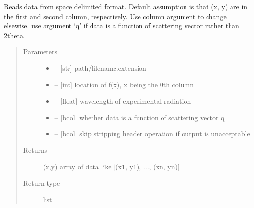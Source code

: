 \documentclass[letterpaper,10pt,english]{sphinxmanual}
\begin{document}
\begin{fulllineitems}
\label{\detokenize{rst/utilities:mstack.utilities.read_data}}
Reads data from space delimited format. Default assumption is that (x, y) are in
the first and second column, respectively. Use column argument to change elsewise.
use argument `q' if data is a function of scattering vector rather than 2theta.
\begin{quote}\begin{description}
\item[{Parameters}] \leavevmode\begin{itemize}
\item {} 
 -- {[}str{]} path/filename.extension

\item {} 
 -- {[}int{]} location of f(x), x being the 0th column

\item {} 
 -- {[}float{]} wavelength of experimental radiation

\item {} 
 -- {[}bool{]} whether data is a function of scattering vector q

\item {} 
 -- {[}bool{]} skip stripping header operation if output is unacceptable

\end{itemize}

\item[{Returns}] \leavevmode
(x,y) array of data like {[}(x1, y1), ..., (xn, yn){]}

\item[{Return type}] \leavevmode
list

\end{description}\end{quote}

\end{fulllineitems}

\end{document}
